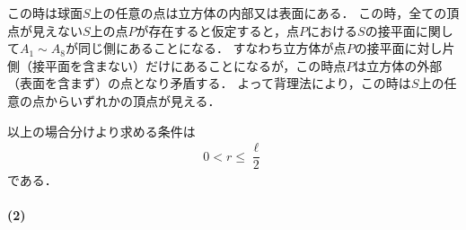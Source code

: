 \documentclass[../../main.tex]{subfiles}
\begin{document}
この時は球面$S$上の任意の点は立方体の内部又は表面にある．
この時，全ての頂点が見えない$S$上の点$P$が存在すると仮定すると，点$P$における$S$の接平面に関して$A_1 \sim A_8$が同じ側にあることになる．
すなわち立方体が点$P$の接平面に対し片側（接平面を含まない）だけにあることになるが，この時点$P$は立方体の外部（表面を含まず）の点となり矛盾する．
よって背理法により，この時は$S$上の任意の点からいずれかの頂点が見える．
\casesend

以上の場合分けより求める条件は
\begin{align}
  0 < r \le \dfrac{\ell}{2}
\end{align}
である．

\paragraph{(2)}
\end{document}
